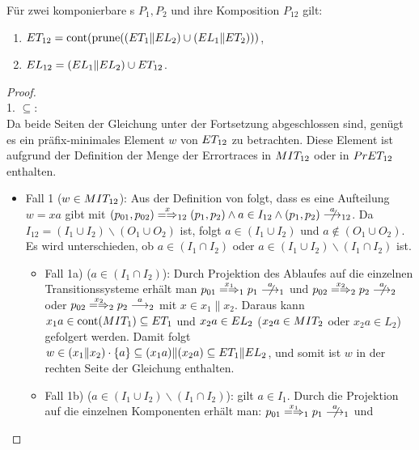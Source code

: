 \begin{Satz}
  \label{KommFehlerSemSatz}
  Für zwei komponierbare \MEIO{}s $P_1,P_2$ und ihre Komposition $P_{12}$ gilt:
  \begin{enumerate}
    \item $ET _{12} = \mathrm{cont} (\mathrm{prune} ((ET _1\|EL _2) \cup (EL _1\|ET
      _2)))$,
    \item $EL _{12} = (EL _1\|EL _2) \cup ET _{12}$.
  \end{enumerate}
\end{Satz}
\begin{proof}\mbox{}\\
  1. \glqq$\subseteq$\grqq{}:\\
  Da beide Seiten der Gleichung unter der Fortsetzung \cont{} abgeschlossen
  sind, genügt es ein präfix-minimales Element $w$ von $ET _{12}$ zu
  betrachten. Diese Element ist aufgrund der Definition der Menge der
  Errortraces in $MIT _{12}$ oder in $PrET _{12}$ enthalten.
  \begin{itemize}
    \item Fall 1 ($w\in MIT _{12}$): Aus der Definition von \MIT{} folgt, dass
      es eine Aufteilung $w=xa$ gibt mit $(p_{01},p_{02}) \weakmay[x]_{12}
      (p_1,p_2) \land a \in I_{12} \land (p_1,p_2) \nmust[a]_{12}$. Da $I_{12}
      = (I_1\cup I_2) \backslash (O_1\cup O_2)$ ist, folgt $a\in (I_1\cup I_2)$
      und $a\notin (O_1\cup O_2)$. Es wird unterschieden, ob $a\in (I_1\cap
      I_2)$ oder $a\in (I_1\cup I_2) \backslash (I_1\cap I_2)$ ist.
    \begin{itemize}
      \item Fall 1a) ($a\in (I_1\cap I_2)$): Durch Projektion des Ablaufes auf
        die einzelnen Transitionssysteme erhält man \oBdA{}
        $p_{01}\weakmay[x_1]_1 p_1\nmust[a]_1$ und $p_{02}\weakmay[x_2]_2
        p_2\nmust[a]_2$ oder $p_{02}\weakmay[x_2]_2 p_2\must[a]_2$ mit $x\in
        x_1\|x_2$. Daraus kann $x_1a\in \mathrm{cont} (MIT _1) \subseteq ET _1$ und
        $x_2a\in EL _2$ ($x_2a\in MIT _2$ oder $x_2a \in L_2$) gefolgert
        werden. Damit folgt $w\in (x_1\|x_2) \cdot \{a\} \subseteq
        (x_1a)\|(x_2a)\subseteq ET _1\|EL _2$, und somit ist $w$ in der
        rechten Seite der Gleichung enthalten.
      \item Fall 1b) ($a\in (I_1\cup I_2)\backslash (I_1\cap I_2)$): \OBdA{}
        gilt $a\in I_1$. Durch die Projektion auf die einzelnen Komponenten
        erhält man: $p_{01}\weakmay[x_1]_1 p_1\nmust[a]_1$ und

\end{itemize}
\end{itemize}
\end{proof}
